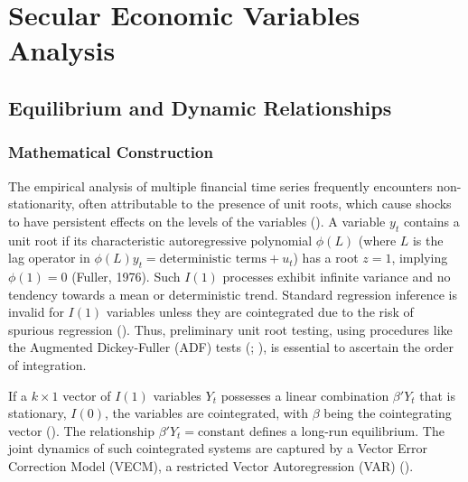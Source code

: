 \documentclass[11pt, a4paper, british]{article}
\begin{document}
\newpage
\section{Secular Economic Variables Analysis}

\subsection{Equilibrium and Dynamic Relationships}

\subsubsection{Mathematical Construction}
The empirical analysis of multiple financial time series frequently encounters non-stationarity, often attributable to the presence of unit roots, which cause shocks to have persistent effects on the levels of the variables (\cite{np}). A variable $y_t$ contains a unit root if its characteristic autoregressive polynomial $\phi(L)$ (where $L$ is the lag operator in $\phi(L)y_t = \text{deterministic terms} + u_t$) has a root $z=1$, implying $\phi(1)=0$ (Fuller, 1976). Such $I(1)$ processes exhibit infinite variance and no tendency towards a mean or deterministic trend. Standard regression inference is invalid for $I(1)$ variables unless they are cointegrated due to the risk of spurious regression (\cite{gk}). Thus, preliminary unit root testing, using procedures like the Augmented Dickey-Fuller (ADF) tests (\cite{df1979}; \cite{df1981}), is essential to ascertain the order of integration.

If a $k \times 1$ vector of $I(1)$ variables $Y_t$ possesses a linear combination $\beta'Y_t$ that is stationary, $I(0)$, the variables are cointegrated, with $\beta$ being the cointegrating vector (\cite{eg}). The relationship $\beta'Y_t = \text{constant}$ defines a long-run equilibrium. The joint dynamics of such cointegrated systems are captured by a Vector Error Correction Model (VECM), a restricted Vector Autoregression (VAR) (\cite{s}).
\end{document}

